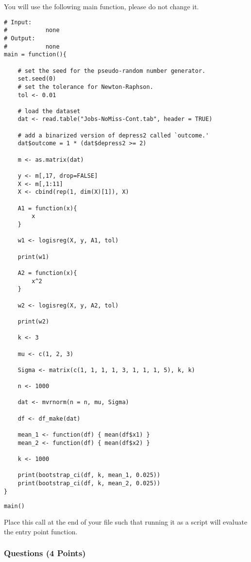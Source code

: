 \documentclass[11pt]{article}
\begin{document}
You will use the following main function, please do not change it.
\begin{lstlisting}
# Input:
#           none
# Output:
#           none
main = function(){

    # set the seed for the pseudo-random number generator.
    set.seed(0)
    # set the tolerance for Newton-Raphson.
    tol <- 0.01
    
    # load the dataset
    dat <- read.table("Jobs-NoMiss-Cont.tab", header = TRUE)

    # add a binarized version of depress2 called `outcome.'
    dat$outcome = 1 * (dat$depress2 >= 2)
    
    m <- as.matrix(dat)
    
    y <- m[,17, drop=FALSE]
    X <- m[,1:11]
    X <- cbind(rep(1, dim(X)[1]), X)

    A1 = function(x){
        x
    }

    w1 <- logisreg(X, y, A1, tol)

    print(w1)

    A2 = function(x){
        x^2
    }

    w2 <- logisreg(X, y, A2, tol)

    print(w2)
    
    k <- 3

    mu <- c(1, 2, 3)

    Sigma <- matrix(c(1, 1, 1, 1, 3, 1, 1, 1, 5), k, k)

    n <- 1000

    dat <- mvrnorm(n = n, mu, Sigma)

    df <- df_make(dat)

    mean_1 <- function(df) { mean(df$x1) }
    mean_2 <- function(df) { mean(df$x2) }

    k <- 1000

    print(bootstrap_ci(df, k, mean_1, 0.025))
    print(bootstrap_ci(df, k, mean_2, 0.025))
}
\end{lstlisting}

\begin{lstlisting}
main()
\end{lstlisting}
Place this call at the end of your file such that running it as a script will evaluate the entry point function.

\subsubsection{Questions (4 Points)}
\end{document}
